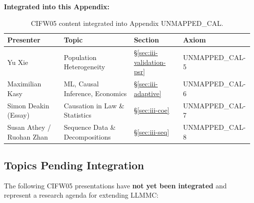 \textbf{Integrated into this Appendix:}

\begin{table}[h]
\centering
\begin{tabular}{llll}
\toprule
\textbf{Presenter} & \textbf{Topic} & \textbf{Section} & \textbf{Axiom} \\
\midrule
Yu Xie & Population Heterogeneity & \S\ref{sec:iii-validation-psr} & UNMAPPED_CAL-5 \\
Maximilian Kasy & ML, Causal Inference, Economics & \S\ref{sec:iii-adaptive} & UNMAPPED_CAL-6 \\
Simon Deakin (Essay) & Causation in Law \& Statistics & \S\ref{sec:iii-coe} & UNMAPPED_CAL-7 \\
Susan Athey / Ruohan Zhan & Sequence Data \& Decompositions & \S\ref{sec:iii-seq} & UNMAPPED_CAL-8 \\
\bottomrule
\end{tabular}
\caption{CIFW05 content integrated into Appendix UNMAPPED_CAL.}
\end{table}

\subsection{Topics Pending Integration}

The following CIFW05 presentations have \textbf{not yet been integrated} and represent
a research agenda for extending LLMMC:

